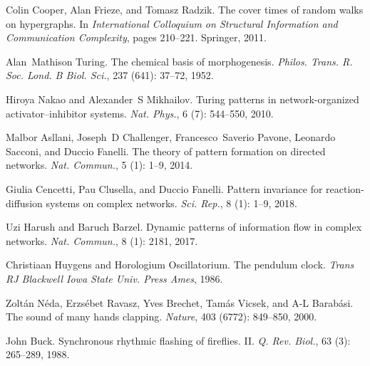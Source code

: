 Colin Cooper, Alan Frieze, and Tomasz Radzik.
\newblock The cover times of random walks on hypergraphs.
\newblock In \emph{International Colloquium on Structural Information and
    Communication Complexity}, pages 210--221. {Springer}, 2011.

Alan~Mathison Turing.
\newblock The chemical basis of morphogenesis.
\newblock \emph{Philos. Trans. R. Soc. Lond. B Biol. Sci.}, 237
(641): 37--72, 1952.

Hiroya Nakao and Alexander~S Mikhailov.
\newblock Turing patterns in network-organized activator--inhibitor systems.
\newblock \emph{Nat. Phys.}, 6 (7): 544--550, 2010.

Malbor Asllani, Joseph~D Challenger, Francesco~Saverio Pavone, Leonardo
Sacconi, and Duccio Fanelli.
\newblock The theory of pattern formation on directed networks.
\newblock \emph{Nat. Commun.}, 5 (1): 1--9, 2014.

Giulia Cencetti, Pau Clusella, and Duccio Fanelli.
\newblock Pattern invariance for reaction-diffusion systems on complex
networks.
\newblock \emph{Sci. Rep.}, 8 (1): 1--9, 2018.

Uzi Harush and Baruch Barzel.
\newblock Dynamic patterns of information flow in complex networks.
\newblock \emph{Nat. Commun.}, 8 (1): 2181, 2017.

Christiaan Huygens and Horologium Oscillatorium.
\newblock The pendulum clock.
\newblock \emph{Trans RJ Blackwell Iowa State Univ. Press Ames}, 1986.

Zolt{\'a}n N{\'e}da, Erzs{\'e}bet Ravasz, Yves Brechet, Tam{\'a}s Vicsek, and
A-L Barab{\'a}si.
\newblock The sound of many hands clapping.
\newblock \emph{Nature}, 403 (6772): 849--850, 2000.

John Buck.
\newblock Synchronous rhythmic flashing of fireflies. {{II}}.
\newblock \emph{Q. Rev. Biol.}, 63 (3): 265--289, 1988.

